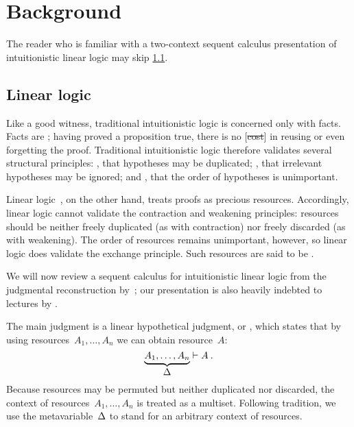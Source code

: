 \section{Background}\label{sec:background}

The reader who is familiar with a two-context sequent calculus presentation of intuitionistic linear logic may skip \cref{sec:linear-logic}.

\subsection{Linear logic}\label{sec:linear-logic}

Like a good witness, traditional intuitionistic logic is concerned only with facts.
Facts are ;
having proved a proposition true, there is no [\st{cost}] in reusing or even forgetting the proof.
Traditional intuitionistic logic therefore validates several structural principles: , that hypotheses may be duplicated; , that irrelevant hypotheses may be ignored; and , that the order of hypotheses is unimportant.

Linear logic~\autocite{Girard:TCS87}, on the other hand, treats proofs as precious resources.
Accordingly, linear logic cannot validate the contraction and weakening principles: resources should be neither freely duplicated (as with contraction) nor freely discarded (as with weakening).
The order of resources remains unimportant, however, so linear logic does validate the exchange principle.
Such resources are said to be .

We will now review a sequent calculus for intuitionistic linear logic from the judgmental reconstruction by~\textcite{Chang+:CMU03}; our presentation is also heavily indebted to lectures by \textcite{Pfenning:816}.

The main judgment is a linear hypothetical judgment, or , which states that by using resources~$A_1, \dotsc, A_n$ we can obtain resource~$A$:%
\begin{equation*}
  \underbrace{A_1, \dotsc, A_n}_{\textstyle \Delta} \vdash A \:.
\end{equation*}
Because resources may be permuted but neither duplicated nor discarded, the context of resources~$A_1, \dotsc, A_n$ is treated as a multiset.
Following tradition, we use the metavariable~$\Delta$ to stand for an arbitrary context of resources.

